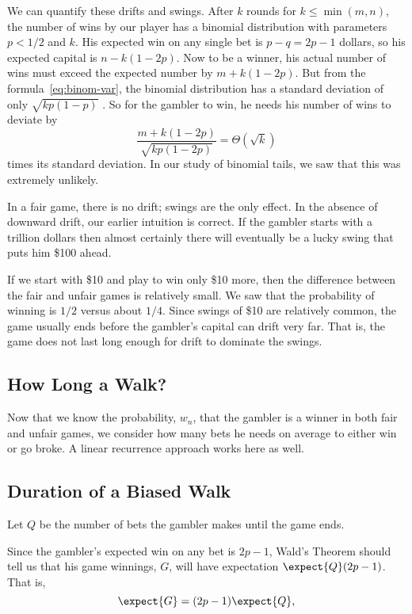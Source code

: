 We can quantify these drifts and swings.  After $k$ rounds for $k \le
\min(m,n)$, the number of wins by our player has a binomial
distribution with parameters $p < 1/2$ and $k$.  His expected win on
any single bet is $p-q = 2p-1$ dollars, so his expected capital is
$n-k(1-2p)$.  Now to be a winner, his actual number of wins must
exceed the expected number by $m+k(1-2p)$.  But from the
formula~\eqref{eq:binom-var}, the binomial distribution has a standard
deviation of only $\sqrt{kp(1-p)}$ .  So for the gambler to win, he
needs his number of wins to deviate by
\[
\frac{m+k(1-2p)}{\sqrt{kp(1-2p)}}=\Theta(\sqrt{k})
\]
times its standard deviation.  In our study of binomial tails, we saw that
this was extremely unlikely.

In a fair game, there is no drift; swings are the only effect.  In the
absence of downward drift, our earlier intuition is correct.  If the
gambler starts with a trillion dollars then almost certainly there
will eventually be a lucky swing that puts him \$100 ahead.

\begin{editingnotes}
If we start with \$10 and play to win only \$10 more, then the difference
between the fair and unfair games is relatively small. We saw that the
probability of winning is $1/2$ versus about $1/4$.  Since swings of \$10
are relatively common, the game usually ends before the gambler's capital
can drift very far.  That is, the game does not last long enough for drift
to dominate the swings.
\end{editingnotes}


\subsection{How Long a Walk?}

Now that we know the probability, $w_n$, that the gambler is a winner in
both fair and unfair games, we consider how many bets he needs on average
to either win or go broke.  A linear recurrence approach works here as well. 

\iffalse
\subsection{Duration of a Biased Walk}

Let $Q$ be the number of bets the gambler makes until the game ends.  

Since the gambler's expected win on any bet is $2p-1$, Wald's
Theorem should tell us that his game winnings, $G$, will have
expectation $\expect{Q}(2p-1)$.  That is,
\begin{equation}\label{LN12:gw}
\expect{G} = (2p-1)\expect{Q},
\end{equation}

